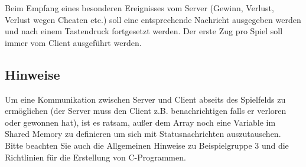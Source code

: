 \documentclass{article}
\begin{document}
Beim Empfang eines besonderen Ereignisses vom Server (Gewinn, Verlust, Verlust wegen
Cheaten etc.) soll eine entsprechende Nachricht ausgegeben werden und nach einem
Tastendruck fortgesetzt werden. Der erste Zug pro Spiel soll immer vom Client ausgeführt werden.


\subsection*{Hinweise}
Um eine Kommunikation zwischen Server und Client abseits des Spielfelds zu ermöglichen
(der Server muss den Client z.B. benachrichtigen falls er verloren oder gewonnen hat),
ist es ratsam, außer dem Array noch eine Variable im Shared Memory zu definieren um sich
mit Statusnachrichten auszutauschen. \\
Bitte beachten Sie auch die Allgemeinen Hinweise zu Beispielgruppe 3 und die Richtlinien
für die Erstellung von C-Programmen.
\end{document}
